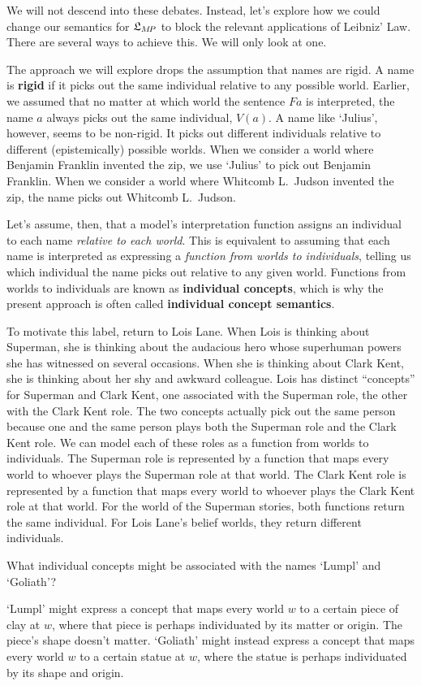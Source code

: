 We will not descend into these debates. Instead, let's explore how we could
change our semantics for $\mathfrak{L}_{M\!P}$ to block the relevant applications of
Leibniz' Law. There are several ways to achieve this. We will only look at one.

The approach we will explore drops the assumption that names are rigid. A name
is \textbf{rigid} if it picks out the same individual relative to any possible
world. Earlier, we assumed that no matter at which world the sentence $Fa$ is
interpreted, the name $a$ always picks out the same individual, $V(a)$. A name
like `Julius', however, seems to be non-rigid. It picks out different
individuals relative to different (epistemically) possible worlds. When we
consider a world where Benjamin Franklin invented the zip, we use `Julius' to
pick out Benjamin Franklin. When we consider a world where Whitcomb L.\ Judson
invented the zip, the name picks out Whitcomb L.\ Judson.

Let's assume, then, that a model's interpretation function assigns an individual
to each name \emph{relative to each world}. This is equivalent to assuming that
each name is interpreted as expressing a \emph{function from worlds to
  individuals}, telling us which individual the name picks out relative to any
given world. Functions from worlds to individuals are known as
\textbf{individual concepts}, which is why the present approach is often called
\textbf{individual concept semantics}.

To motivate this label, return to Lois Lane. When Lois is thinking about
Superman, she is thinking about the audacious hero whose superhuman powers she
has witnessed on several occasions. When she is thinking about Clark Kent, she
is thinking about her shy and awkward colleague. Lois has distinct ``concepts''
for Superman and Clark Kent, one associated with the Superman role, the other
with the Clark Kent role. The two concepts actually pick out the same person
because one and the same person plays both the Superman role and the Clark Kent
role. We can model each of these roles as a function from worlds to individuals.
The Superman role is represented by a function that maps every world to whoever
plays the Superman role at that world. The Clark Kent role is represented by a
function that maps every world to whoever plays the Clark Kent role at that
world. For the world of the Superman stories, both functions return the same
individual. For Lois Lane's belief worlds, they return different individuals.

\begin{exercise}
  What individual concepts might be associated with the names `Lumpl' and
  `Goliath'?
\end{exercise}
\begin{solution}
  `Lumpl' might express a concept that maps every world $w$ to a certain piece
  of clay at $w$, where that piece is perhaps individuated by its matter or
  origin. The piece's shape doesn't matter. `Goliath' might instead express a concept that maps every world $w$ to a certain statue at $w$, where the statue is perhaps individuated by its shape and origin.
\end{solution}

